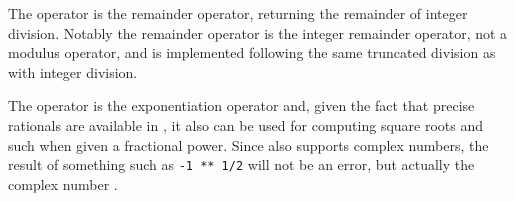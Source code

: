 The \op{\%} operator is the remainder operator, returning the remainder of
integer division. Notably the remainder operator is the integer remainder operator,
not a modulus operator, and is implemented following the same truncated division
as with integer division.

The \op{**} operator is the exponentiation operator and, given the fact that
precise rationals are available in \Trilogy{}, it also can be used for computing
square roots and such when given a fractional power. Since \Trilogy{} also
supports complex numbers, the result of something such as \texttt{-1 ** 1/2}
will not be an error, but actually the complex number .

\begin{prooftree}
\end{prooftree}

\begin{prooftree}
\end{prooftree}

\begin{prooftree}
\end{prooftree}

\begin{prooftree}
\end{prooftree}

\begin{prooftree}
\end{prooftree}

\begin{prooftree}
\end{prooftree}

